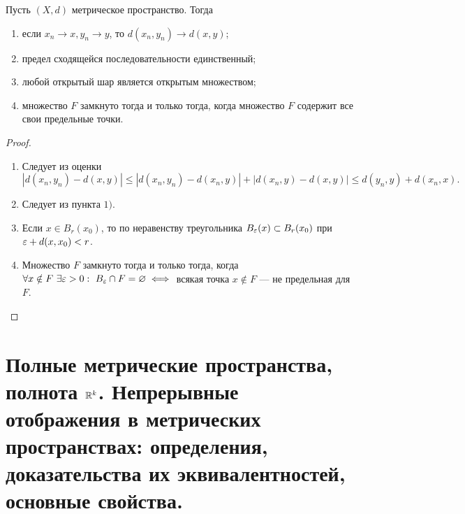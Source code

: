 \documentclass[a4paper]{article}
\theoremstyle{named}
\begin{document}
    \begin{lemma*}
        Пусть $(X, d)$ метрическое пространство. Тогда
        \begin{enumerate}
        \item
            если $x_n \to x, y_n \to y$, то $d(x_n, y_n) \to d(x, y)$;

        \item
            предел сходящейся последовательности единственный;

        \item
            любой открытый шар является открытым множеством;

        \item
            множество $F$ замкнуто тогда и только тогда, когда множество $F$ содержит все свои предельные точки.
        \end{enumerate}

        \begin{proof}
            ~

            \begin{enumerate}
            \item
                Следует из оценки
                \begin{equation*}
                    |d(x_n, y_n) - d(x, y)| \leq |d(x_n, y_n) - d(x_n, y)| + |d(x_n, y) - d(x, y)| \leq d(y_n, y) + d(x_n, x).
                \end{equation*}

            \item
                Следует из пункта $1)$.

            \item
                Если $x \in B_r(x_0)$, то по неравенству треугольника $B_{\varepsilon}(x) \subset B_r(x_0)$ при $\varepsilon + d(x, x_0) < r$.

            \item
                Множество $F$ замкнуто тогда и только тогда, когда $\forall x \notin F \ \exists \varepsilon > 0: \ B_{\varepsilon} \cap F = \varnothing \iff$ всякая точка $x \notin F$ --- не предельная для $F$.
            \end{enumerate}
        \end{proof}
    \end{lemma*}

    \section{Полные метрические пространства, полнота $\mathbb{R}^k$. Непрерывные отображения в метрических пространствах: определения, доказательства их эквивалентностей, основные свойства.}
\end{document}
